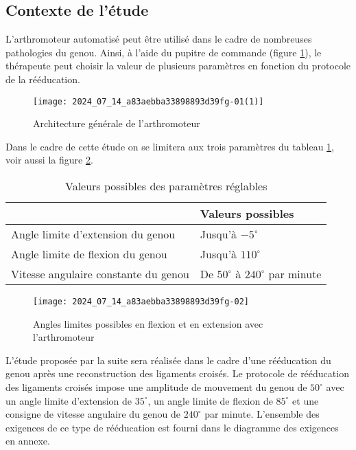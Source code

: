 \subsection{Contexte de l'étude}
L'arthromoteur automatisé peut être utilisé dans le cadre de nombreuses pathologies du genou. Ainsi, à l'aide du pupitre de commande (figure \ref{fig:ccs_mp_2024:fig:02}), le thérapeute peut choisir la valeur de plusieurs paramètres en fonction du protocole de la rééducation.

\begin{figure}[!h]
\centering
\texttt{[image: 2024\_07\_14\_a83aebba33898893d39fg-01(1)]}
\caption{\label{fig:ccs_mp_2024:fig:02}Architecture générale de l'arthromoteur}
\end{figure}
Dans le cadre de cette étude on se limitera aux trois paramètres du tableau \ref{tab:ccs_mp_2024:tab:01}, voir aussi la figure \ref{fig:ccs_mp_2024:fig:03}.

\begin{table}[!h]
\centering
\begin{tabular}{ll}
 & \textbf{Valeurs possibles} \\
\hline
Angle limite d'extension du genou & Jusqu'à $-5^{\circ}$ \\
Angle limite de flexion du genou & Jusqu'à $110^{\circ}$ \\
Vitesse angulaire constante du genou & De $50^{\circ}$ à $240^{\circ}$ par minute \\
\hline
\end{tabular}
\caption{\label{tab:ccs_mp_2024:tab:01}Valeurs possibles des paramètres réglables}
\end{table}



\begin{figure}[!h]
\centering
\texttt{[image: 2024\_07\_14\_a83aebba33898893d39fg-02]}
\caption{\label{fig:ccs_mp_2024:fig:03}Angles limites possibles en flexion et en extension avec l'arthromoteur}
\end{figure}

L'étude proposée par la suite sera réalisée dans le cadre d'une rééducation du genou après une reconstruction des ligaments croisés. Le protocole de rééducation des ligaments croisés impose une amplitude de mouvement du genou de $50^{\circ}$ avec un angle limite d'extension de $35^{\circ}$, un angle limite de flexion de $85^{\circ}$ et une consigne de vitesse angulaire du genou de $240^{\circ}$ par minute. L'ensemble des exigences de ce type de rééducation est fourni dans le diagramme des exigences en annexe.

